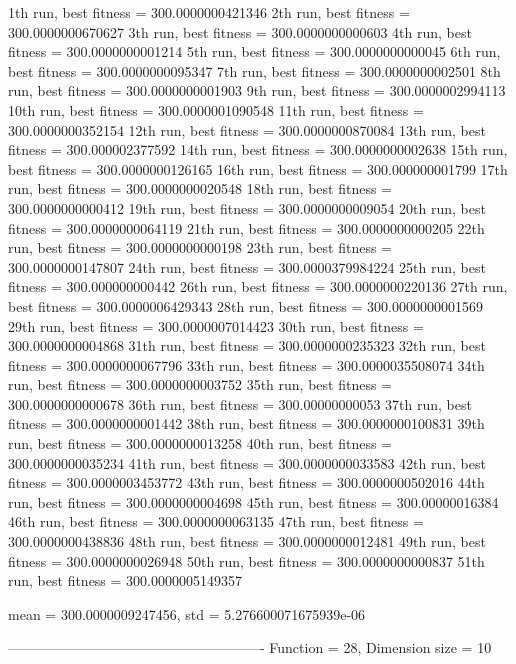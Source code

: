 1th run, best fitness = 300.0000000421346
2th run, best fitness = 300.0000000670627
3th run, best fitness = 300.0000000000603
4th run, best fitness = 300.0000000001214
5th run, best fitness = 300.0000000000045
6th run, best fitness = 300.0000000095347
7th run, best fitness = 300.0000000002501
8th run, best fitness = 300.0000000001903
9th run, best fitness = 300.0000002994113
10th run, best fitness = 300.0000001090548
11th run, best fitness = 300.0000000352154
12th run, best fitness = 300.0000000870084
13th run, best fitness = 300.000002377592
14th run, best fitness = 300.0000000002638
15th run, best fitness = 300.0000000126165
16th run, best fitness = 300.000000001799
17th run, best fitness = 300.0000000020548
18th run, best fitness = 300.0000000000412
19th run, best fitness = 300.0000000009054
20th run, best fitness = 300.0000000064119
21th run, best fitness = 300.0000000000205
22th run, best fitness = 300.0000000000198
23th run, best fitness = 300.0000000147807
24th run, best fitness = 300.0000379984224
25th run, best fitness = 300.000000000442
26th run, best fitness = 300.0000000220136
27th run, best fitness = 300.0000006429343
28th run, best fitness = 300.0000000001569
29th run, best fitness = 300.0000007014423
30th run, best fitness = 300.0000000004868
31th run, best fitness = 300.0000000235323
32th run, best fitness = 300.0000000067796
33th run, best fitness = 300.0000035508074
34th run, best fitness = 300.0000000003752
35th run, best fitness = 300.0000000000678
36th run, best fitness = 300.00000000053
37th run, best fitness = 300.0000000001442
38th run, best fitness = 300.0000000100831
39th run, best fitness = 300.0000000013258
40th run, best fitness = 300.0000000035234
41th run, best fitness = 300.0000000033583
42th run, best fitness = 300.0000003453772
43th run, best fitness = 300.0000000502016
44th run, best fitness = 300.0000000004698
45th run, best fitness = 300.00000016384
46th run, best fitness = 300.0000000063135
47th run, best fitness = 300.0000000438836
48th run, best fitness = 300.0000000012481
49th run, best fitness = 300.0000000026948
50th run, best fitness = 300.0000000000837
51th run, best fitness = 300.0000005149357

mean = 300.0000009247456, std = 5.276600071675939e-06

-------------------------------------------------------
Function = 28, Dimension size = 10


